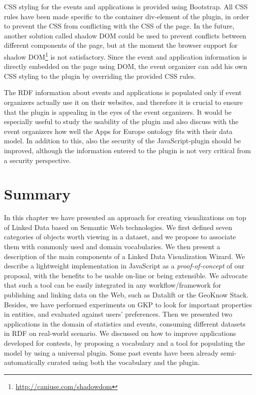 CSS styling for the events and applications is provided using Bootstrap. All CSS rules have been made specific to the container div-element of the plugin, in order to prevent the CSS from conflicting with the CSS of the page. In the future, another solution called shadow DOM could be used to prevent conflicts between different components of the page, but at the moment the browser support for shadow DOM\footnote{\url{http://caniuse.com/shadowdom}} is not satisfactory. Since the event and application information is directly embedded on the page using DOM, the event organizer can add his own CSS styling to the plugin by overriding the provided CSS rules.

The RDF information about events and applications is populated only if event organizers actually use it on their websites, and therefore it is crucial to ensure that the plugin is appealing in the eyes of the event organizers. It would be especially useful to study the usability of the plugin and also discuss with the event organizers how well the Apps for Europe ontology fits with their data model. In addition to this, also the security of the JavaScript-plugin should be improved, although the information entered to the plugin is not very critical from a security perspective.

\section{Summary}
\label{sec:summarych5}

In this chapter we have presented  an approach for creating visualizations on top of Linked Data based on Semantic Web technologies. We first defined seven categories of objects worth viewing in a dataset, and we propose to associate them with commonly used and domain vocabularies. We then present a description of the main components of a Linked Data Visualization Wizard. We describe a lightweight implementation in JavaScript as a \textit{proof-of-concept} of our proposal, with the benefits to be usable on-line or being extensible. We advocate that such a tool can be easily integrated  in any workflow/framework for publishing and linking data on the Web, such as Datalift or the GeoKnow Stack. Besides, we have performed experiments on GKP to look for important properties in entities, and evaluated against users' preferences. Then we presented two applications in the domain of statistics and events, consuming different datasets in RDF on real-world scenario. We discussed on how to improve applications developed for contests, by proposing a vocabulary and a tool for populating the model by using a universal plugin. Some past events have been already semi-automatically curated using both the vocabulary and the plugin. 



